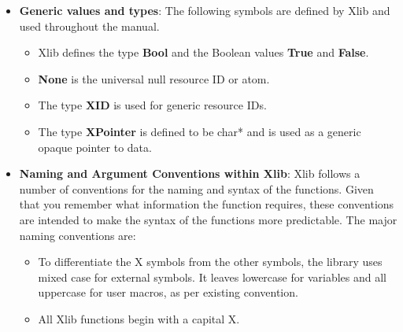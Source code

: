 \documentclass{report}
\begin{document}
\begin{itemize}
\begin{cppcode}
                RANDR     resizing/rotating screens, monitor layout
                XRender   improved 2D rendering/compositing primitives
                XInput2   advanced input devices/events
                XFixes    fixes and additions to older X behavior
                Composite off-screen window compositing support
                Shape     non-rectangular windows
                GLX       OpenGL integration with X
            \end{cppcode}
            \bigbreak \noindent 
            Before using an extension, a client usually checks whether the server supports it. Xlib provides functions such as:
            \bigbreak \noindent 
            \begin{cppcode}
                XQueryExtension(display, "RANDR", &major, &first_event, &first_error);
            \end{cppcode}
        \item \textbf{Generic values and types}: The following symbols are defined by Xlib and used throughout the manual.
            \begin{itemize}
                \item Xlib defines the type \textbf{Bool} and the Boolean values \textbf{True} and \textbf{False}.
                \item \textbf{None} is the universal null resource ID or atom.
                \item The type \textbf{XID} is used for generic resource IDs.
                \item The type \textbf{XPointer} is defined to be char* and is used as a generic opaque pointer to data.
            \end{itemize}
        \item \textbf{Naming and Argument Conventions within Xlib}: Xlib follows a number of conventions for the naming and syntax of the functions. Given that you remember what information the function requires, these conventions are intended to make the syntax of the functions more predictable.
            \bigbreak \noindent 
            The major naming conventions are:
            \begin{itemize}
                \item To differentiate the X symbols from the other symbols, the library uses mixed case for external symbols. It leaves lowercase for variables and all uppercase for user macros, as per existing convention.
                \item All Xlib functions begin with a capital X.

\end{itemize}
\end{itemize}
\end{document}
